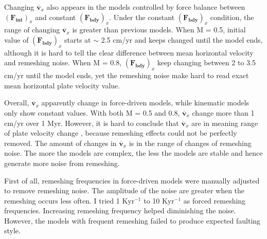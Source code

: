 \documentclass[letterpaper,12pt,notitle]{memphisthesis}                     %
\begin{document}
Changing $\overline{\boldsymbol{v}}_{x}$ also appears in the models controlled by force balance between $(\boldsymbol{F_{int}})_x$ and constant $(\boldsymbol{F_{bdy}})_x$. Under the constant $(\boldsymbol{F_{bdy}})_x$ condition, the range of changing $\overline{\boldsymbol{v}}_{x}$ is greater than previous models. When M = 0.5, initial value of $(\boldsymbol{F_{bdy}})_x$ starts at $\sim$ 2.5 cm/yr and keeps changed until the model ends, although it is hard to tell the clear difference between mean horizontal velocity and remeshing noise. When M = 0.8, $(\boldsymbol{F_{bdy}})_x$ keep changing between 2 to 3.5 cm/yr until the model ends, yet the remeshing noise make hard to read exact mean horizontal plate velocity value.

Overall, $\overline{\boldsymbol{v}}_{x}$ apparently change in force-driven models, while kinematic models only show constant values. With both M = 0.5 and 0.8, $\overline{\boldsymbol{v}}_{x}$ change more than 1 cm/yr over 1 Myr. However, it is hard to conclude that $\overline{\boldsymbol{v}}_{x}$ are in meaning range of plate velocity change
, because remeshing effects could not be perfectly removed. The amount of changes in $\overline{\boldsymbol{v}}_{x}$ is in the range of changes of remeshing noise. The more the models are complex, the less the models are stable and hence generate more noise from remeshing.

First of all, remeshing frequencies in force-driven models were manually adjusted to remove remeshing noise. The amplitude of the noise %
are greater when the remeshing occurs less often. I tried 1 Kyr$^{-1}$ to 10 Kyr$^{-1}$ as forced remeshing frequencies. Increasing remeshing frequency helped diminishing the noise. However, the models with frequent remeshing failed to produce expected faulting style.
\end{document}
